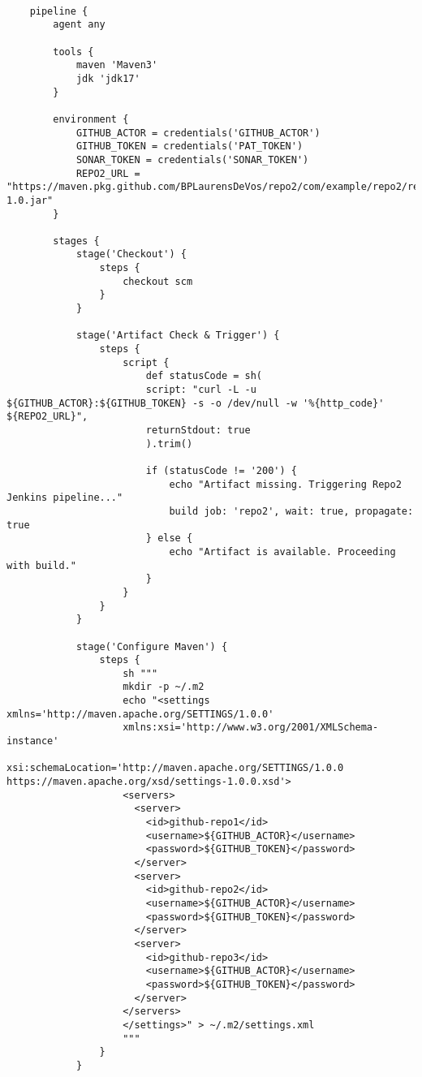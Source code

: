 \begin{verbatim}
    
    pipeline {
        agent any
        
        tools {
            maven 'Maven3'
            jdk 'jdk17'
        }
        
        environment {
            GITHUB_ACTOR = credentials('GITHUB_ACTOR')
            GITHUB_TOKEN = credentials('PAT_TOKEN')
            SONAR_TOKEN = credentials('SONAR_TOKEN')
            REPO2_URL = "https://maven.pkg.github.com/BPLaurensDeVos/repo2/com/example/repo2/repo2/1.0/repo2-1.0.jar"
        }
        
        stages {
            stage('Checkout') {
                steps {
                    checkout scm
                }
            }
            
            stage('Artifact Check & Trigger') {
                steps {
                    script {
                        def statusCode = sh(
                        script: "curl -L -u ${GITHUB_ACTOR}:${GITHUB_TOKEN} -s -o /dev/null -w '%{http_code}' ${REPO2_URL}",
                        returnStdout: true
                        ).trim()
                        
                        if (statusCode != '200') {
                            echo "Artifact missing. Triggering Repo2 Jenkins pipeline..."
                            build job: 'repo2', wait: true, propagate: true
                        } else {
                            echo "Artifact is available. Proceeding with build."
                        }
                    }
                }
            }
            
            stage('Configure Maven') {
                steps {
                    sh """
                    mkdir -p ~/.m2
                    echo "<settings xmlns='http://maven.apache.org/SETTINGS/1.0.0'
                    xmlns:xsi='http://www.w3.org/2001/XMLSchema-instance'
                    xsi:schemaLocation='http://maven.apache.org/SETTINGS/1.0.0 https://maven.apache.org/xsd/settings-1.0.0.xsd'>
                    <servers>
                      <server>
                        <id>github-repo1</id>
                        <username>${GITHUB_ACTOR}</username>
                        <password>${GITHUB_TOKEN}</password>
                      </server>
                      <server>
                        <id>github-repo2</id>
                        <username>${GITHUB_ACTOR}</username>
                        <password>${GITHUB_TOKEN}</password>
                      </server>
                      <server>
                        <id>github-repo3</id>
                        <username>${GITHUB_ACTOR}</username>
                        <password>${GITHUB_TOKEN}</password>
                      </server>
                    </servers>
                    </settings>" > ~/.m2/settings.xml
                    """
                }
            }
            

\end{verbatim}
